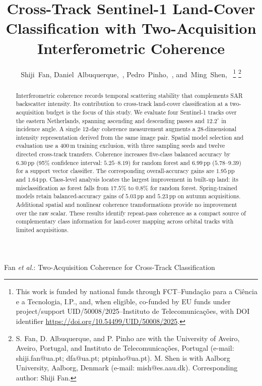 \documentclass[journal]{IEEEtran}
\newcommand{\pp}{\,\mathrm{pp}}
\begin{document}
\title{Cross-Track Sentinel-1 Land-Cover Classification with Two-Acquisition Interferometric Coherence}

\author{Shiji~Fan,
        Daniel~Albuquerque,~,
        Pedro~Pinho,~,
        and~Ming~Shen,~%
\thanks{This work is funded by national funds through FCT--Funda\c{c}\~ao para a
Ci\^encia e a Tecnologia, I.P., and, when eligible, co-funded by EU funds under
project/support UID/50008/2025--Instituto de Telecomunica\c{c}\~oes, with DOI
identifier \protect\url{https://doi.org/10.54499/UID/50008/2025}.}%
\thanks{S. Fan, D. Albuquerque, and P. Pinho are with the University of Aveiro,
Aveiro, Portugal, and Instituto de Telecomunica\c{c}\~oes, Portugal (e-mail:
shiji.fan@ua.pt; dfa@ua.pt; ptpinho@ua.pt). M. Shen is with Aalborg University,
Aalborg, Denmark (e-mail: mish@es.aau.dk). Corresponding author: Shiji Fan.}%
}

%
{Fan \MakeLowercase{\textit{et al.}}: Two-Acquisition Coherence for Cross-Track Classification}

\maketitle

\begin{abstract}
Interferometric coherence records temporal scattering stability that complements SAR backscatter intensity. Its contribution to cross-track land-cover classification at a two-acquisition budget is the focus of this study. We evaluate four Sentinel-1 tracks over the eastern Netherlands, spanning ascending and descending passes and $12.2^\circ$ in incidence angle. A single 12-day coherence measurement augments a 28-dimensional intensity representation derived from the same image pair. Spatial model selection and evaluation use a 400\,m training exclusion, with three sampling seeds and twelve directed cross-track transfers. Coherence increases five-class balanced accuracy by $6.30\pp$ (95\% confidence interval: $5.25$--$8.19$) for random forest and $6.99\pp$ ($5.78$--$9.39$) for a support vector classifier. The corresponding overall-accuracy gains are $1.95\pp$ and $1.64\pp$. Class-level analysis locates the largest improvement in built-up land: its misclassification as forest falls from $17.5\%$ to $0.8\%$ for random forest. Spring-trained models retain balanced-accuracy gains of $5.03\pp$ and $5.23\pp$ on autumn acquisitions. Additional spatial and nonlinear coherence transformations provide no improvement over the raw scalar. These results identify repeat-pass coherence as a compact source of complementary class information for land-cover mapping across orbital tracks with limited acquisitions.
\end{abstract}
\end{document}

